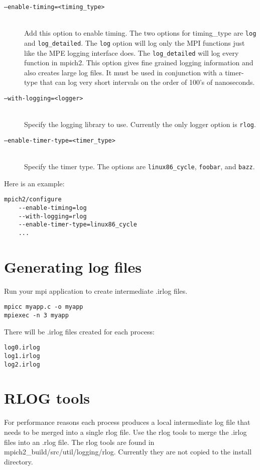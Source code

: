\documentclass[dvipdfm,11pt]{article}
\begin{document}
\begin{description}
\item[\texttt{--enable-timing=<timing\_type>}]\mbox{}\\
Add this option to enable timing.  The two options for timing\_type are \texttt{log}
and \texttt{log\_detailed}.  The \texttt{log} option will log only the MPI functions just
like the MPE logging interface does.  The \texttt{log\_detailed} will log every
function in mpich2.  This option gives fine grained logging information and
also creates large log files.  It must be used in conjunction with a timer-type that
can log very short intervals on the order of 100's of nanoseconds.

\item[\texttt{--with-logging=<logger>}]\mbox{}\\
Specify the logging library to use.  Currently the only logger option is \texttt{rlog}.

\item[\texttt{--enable-timer-type=<timer\_type>}]\mbox{}\\
Specify the timer type.  The options are \texttt{linux86\_cycle}, \texttt{foobar}, and \texttt{bazz}.
\end{description}

Here is an example:
\begin{verbatim}
mpich2/configure
    --enable-timing=log
    --with-logging=rlog
    --enable-timer-type=linux86_cycle
    ...
\end{verbatim}

\section{Generating log files}
\label{sec:genlogs}
Run your mpi application to create intermediate .irlog files.

\begin{verbatim}
mpicc myapp.c -o myapp
mpiexec -n 3 myapp
\end{verbatim}
There will be .irlog files created for each process:
\begin{verbatim}
log0.irlog
log1.irlog
log2.irlog
\end{verbatim}

\section{RLOG tools}
\label{sec:tools}
For performance reasons each process produces a local intermediate log file that
needs to be merged into a single rlog file.  Use the rlog tools to merge the .irlog files
 into an .rlog file.  The rlog tools are found in mpich2\_build/src/util/logging/rlog.
Currently they are not copied to the install directory.
\end{document}
